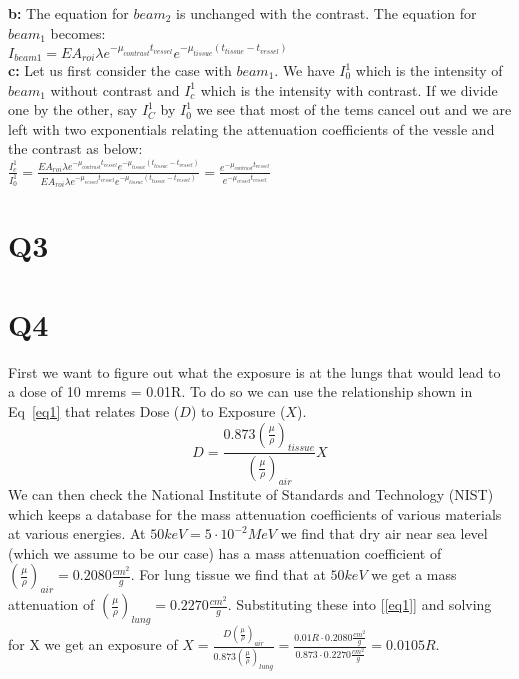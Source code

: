 \documentclass[12pt]{article}
\begin{document}
\noindent\textbf{b: }
The equation for $beam_2$ is unchanged with the contrast. The equation for $beam_1$ becomes:\\
$I_{beam1} =EA_{roi}\lambda e^{-\mu_{contrast}t_{vessel}}e^{-\mu_{tissue}(t_{tissue}-t_{vessel})}$\\

\noindent\textbf{c: }
Let us first consider the case with $beam_1$. We have $I_0^1$ which is the intensity of $beam_1$ without contrast and $I_c^1$ which is the intensity with contrast. If we divide one by the other, say $I_C^1$ by $I_0^1$ we see that most of the tems cancel out and we are left with two exponentials relating the attenuation coefficients of the vessle and the contrast as below:\\
$\frac{I_c^1}{I_0^1} = \frac{EA_{roi}\lambda e^{-\mu_{contrast}t_{vessel}}e^{-\mu_{tissue}(t_{tissue}-t_{vessel})}}{EA_{roi}\lambda e^{-\mu_{vessel}t_{vessel}}e^{-\mu_{tissue}(t_{tissue}-t_{vessel})}} = \frac{e^{-\mu_{contrast}t_{vessel}}}{e^{-\mu_{vessel}t_{vessel}}}$

\section{Q3}

\section{Q4}
First we want to figure out what the exposure is at the lungs that would lead to a dose of 10 mrems = 0.01R. To do so we can use the relationship shown in Eq~\ref{eq1} that relates Dose ($D$) to Exposure ($X$).
\begin{equation}
D = \frac{0.873(\frac{\mu}{\rho})_{tissue}}{(\frac{\mu}{\rho})_{air}}X
\label{eq1}
\end{equation}
\noindent We can then check the National Institute of Standards and Technology (NIST) which keeps a database for the mass attenuation coefficients of various materials at various energies. At $50keV = 5\cdot10^{-2}MeV$ we find that dry air near sea level (which we assume to be our case) has a mass attenuation coefficient of $(\frac{\mu}{\rho})_{air} = 0.2080\frac{cm^2}{g}$. For lung tissue we find that at $50keV$ we get a mass attenuation of $(\frac{\mu}{\rho})_{lung} = 0.2270\frac{cm^2}{g}$. Substituting these into [\ref{eq1}] and solving for X we get an exposure of $X = \frac{D(\frac{\mu}{\rho})_{air}}{0.873(\frac{\mu}{\rho})_{lung} } = \frac{0.01 R \cdot 0.2080\frac{cm^2}{g}}{0.873\cdot 0.2270\frac{cm^2}{g}} = 0.0105 R$. 
\end{document}
